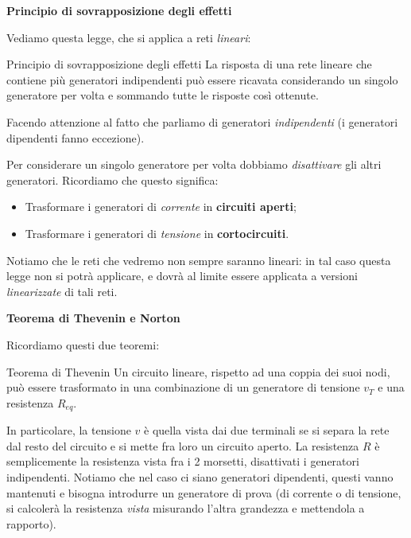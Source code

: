 \documentclass[a4paper,11pt]{article}
\begin{document}
\par\smallskip

\noindent
\textbf{\textsf{Principio di sovrapposizione degli effetti}}

\noindent
Vediamo questa legge, che si applica a reti \textit{lineari}:
\begin{theorem}{Principio di sovrapposizione degli effetti}
La risposta di una rete lineare che contiene più generatori indipendenti può essere ricavata considerando un singolo generatore per volta e sommando tutte le risposte così ottenute.
\end{theorem}
Facendo attenzione al fatto che parliamo di generatori \textit{indipendenti} (i generatori dipendenti fanno eccezione).

Per considerare un singolo generatore per volta dobbiamo \textit{disattivare} gli altri generatori. Ricordiamo che questo significa:
\begin{itemize}
	\item Trasformare i generatori di \textit{corrente} in \textbf{circuiti aperti};
	\item Trasformare i generatori di \textit{tensione} in \textbf{cortocircuiti}.
\end{itemize}

Notiamo che le reti che vedremo non sempre saranno lineari: in tal caso questa legge non si potrà applicare, e dovrà al limite essere applicata a versioni \textit{linearizzate} di tali reti.

\par\smallskip

\noindent
\textbf{\textsf{Teorema di Thevenin e Norton}}


\noindent
Ricordiamo questi due teoremi:
\begin{theorem}{Teorema di Thevenin}
	Un circuito lineare, rispetto ad una coppia dei suoi nodi, può essere trasformato in una combinazione di un generatore di tensione $v_T$ e una resistenza $R_{eq}$.
\end{theorem}

In particolare, la tensione $v$ è quella vista dai due terminali se si separa la rete dal resto del circuito e si mette fra loro un circuito aperto. La resistenza $R$ è semplicemente la resistenza vista fra i 2 morsetti, disattivati i generatori indipendenti. 
Notiamo che nel caso ci siano generatori dipendenti, questi vanno mantenuti e bisogna introdurre un generatore di prova (di corrente o di tensione, si calcolerà la resistenza \textit{vista} misurando l'altra grandezza e mettendola a rapporto).
\end{document}

